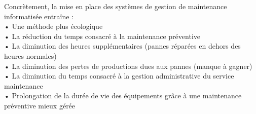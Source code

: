 Concrètement, la mise en place des systèmes de gestion de maintenance informatisée entraîne :\\
•	Une méthode plus écologique\\
•	La réduction du temps consacré à la maintenance préventive\\
•	La diminution des heures supplémentaires (pannes réparées en dehors des heures normales)\\
•	La diminution des pertes de productions dues aux pannes (manque à gagner)\\
•	La diminution du temps consacré à la gestion administrative du service maintenance\\
•	Prolongation de la durée de vie des équipements grâce à une maintenance préventive mieux gérée\\
\pagebreak